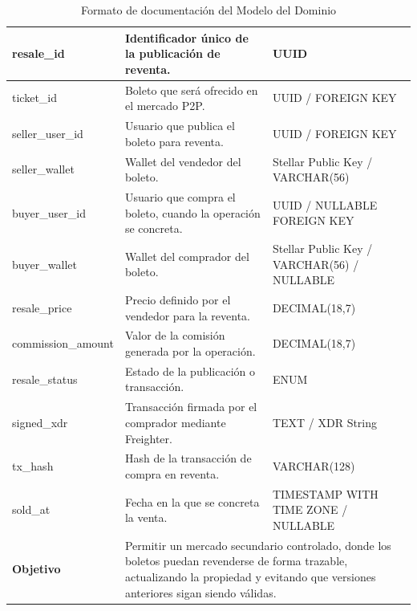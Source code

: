 \documentclass[12pt,letterpaper]{article}
\begin{document}
\begin{table}[H]
\begin{tabularx}{\textwidth}{|p{3.2cm}|X|p{3.8cm}|}
resale\_id & Identificador único de la publicación de reventa. & UUID \\ \hline
ticket\_id & Boleto que será ofrecido en el mercado P2P. & UUID / FOREIGN KEY \\ \hline
seller\_user\_id & Usuario que publica el boleto para reventa. & UUID / FOREIGN KEY \\ \hline
seller\_wallet & Wallet del vendedor del boleto. & Stellar Public Key / VARCHAR(56) \\ \hline
buyer\_user\_id & Usuario que compra el boleto, cuando la operación se concreta. & UUID / NULLABLE FOREIGN KEY \\ \hline
buyer\_wallet & Wallet del comprador del boleto. & Stellar Public Key / VARCHAR(56) / NULLABLE \\ \hline
resale\_price & Precio definido por el vendedor para la reventa. & DECIMAL(18,7) \\ \hline
commission\_amount & Valor de la comisión generada por la operación. & DECIMAL(18,7) \\ \hline
resale\_status & Estado de la publicación o transacción. & ENUM \\ \hline
signed\_xdr & Transacción firmada por el comprador mediante Freighter. & TEXT / XDR String \\ \hline
tx\_hash & Hash de la transacción de compra en reventa. & VARCHAR(128) \\ \hline
sold\_at & Fecha en la que se concreta la venta. & TIMESTAMP WITH TIME ZONE / NULLABLE \\ \hline

\textbf{Objetivo} & 
\multicolumn{2}{X|}{Permitir un mercado secundario controlado, donde los boletos puedan revenderse de forma trazable, actualizando la propiedad y evitando que versiones anteriores sigan siendo válidas.} \\ \hline

\end{tabularx}

\caption{Formato de documentación del Modelo del Dominio}
\label{tab:modelo_dominio_reventa_transaccion_p2p}
\normalsize
\end{table}
\end{document}
